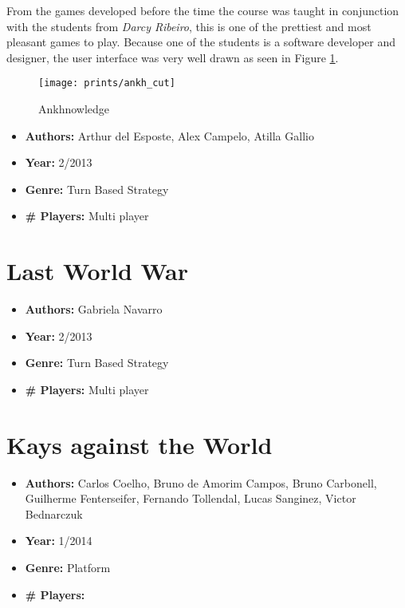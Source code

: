 \begin{apendicesenv}
From the games developed before the time the course was taught in conjunction with the students from \textit{Darcy Ribeiro}, this is one of the prettiest and most pleasant games to play. Because one of the students is a software developer and designer, the user interface was very well drawn as seen in Figure \ref{fig:ankh}.

\begin{figure}[h!]
\centering
\texttt{[image: prints/ankh\_cut]}
\caption{Ankhnowledge}
\label{fig:ankh}
\end{figure}

\begin{itemize}
\item[] \textbf{Authors:} Arthur del Esposte, Alex Campelo, Atilla Gallio
\item[] \textbf{Year:} 2/2013
\item[] \textbf{Genre:} Turn Based Strategy
\item[] \textbf{\# Players:} Multi player
\end{itemize}


\section{Last World War}
\label {sec:last_world_war}


\begin{itemize}
\item[] \textbf{Authors:} Gabriela Navarro
\item[] \textbf{Year:} 2/2013
\item[] \textbf{Genre:} Turn Based Strategy
\item[] \textbf{\# Players:} Multi player
\end{itemize}


\section{Kays against the World}
\label {sec:kays}


\begin{itemize}
\item[] \textbf{Authors:} Carlos Coelho, Bruno de Amorim Campos, Bruno Carbonell, Guilherme Fenterseifer, Fernando Tollendal, Lucas Sanginez, Victor Bednarczuk
\item[] \textbf{Year:} 1/2014
\item[] \textbf{Genre:} Platform
\item[] \textbf{\# Players:}
\end{itemize}



\end{apendicesenv}
